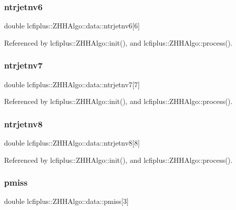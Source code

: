 \subsubsection{ntrjetnv6}
{\footnotesize\ttfamily double lcfiplus\+::\+Z\+H\+H\+Algo\+::data\+::ntrjetnv6[6]}



Referenced by lcfiplus\+::\+Z\+H\+H\+Algo\+::init(), and lcfiplus\+::\+Z\+H\+H\+Algo\+::process().

\mbox{\label{structlcfiplus_1_1ZHHAlgo_1_1data_a51a8ed02e92b2d33b04baf6e50c2118c}} 
\subsubsection{ntrjetnv7}
{\footnotesize\ttfamily double lcfiplus\+::\+Z\+H\+H\+Algo\+::data\+::ntrjetnv7[7]}



Referenced by lcfiplus\+::\+Z\+H\+H\+Algo\+::init(), and lcfiplus\+::\+Z\+H\+H\+Algo\+::process().

\mbox{\label{structlcfiplus_1_1ZHHAlgo_1_1data_aa0538aeedc0242b3766080071d4abe3c}} 
\subsubsection{ntrjetnv8}
{\footnotesize\ttfamily double lcfiplus\+::\+Z\+H\+H\+Algo\+::data\+::ntrjetnv8[8]}



Referenced by lcfiplus\+::\+Z\+H\+H\+Algo\+::init(), and lcfiplus\+::\+Z\+H\+H\+Algo\+::process().

\mbox{\label{structlcfiplus_1_1ZHHAlgo_1_1data_a2699f8381353bf13ae4ce6867ba96575}} 
\subsubsection{pmiss}
{\footnotesize\ttfamily double lcfiplus\+::\+Z\+H\+H\+Algo\+::data\+::pmiss[3]}



